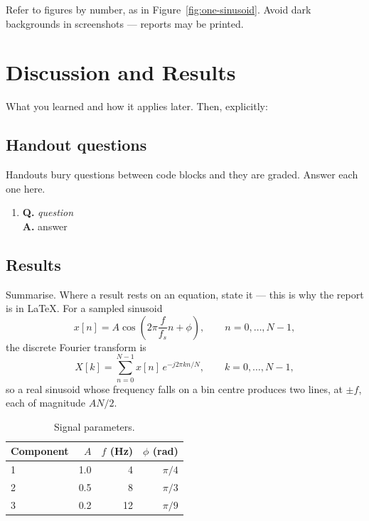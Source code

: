 \documentclass[11pt]{article}
\begin{document}
Refer to figures by number, as in Figure~\ref{fig:one-sinusoid}. Avoid dark
backgrounds in screenshots --- reports may be printed.

\section{Discussion and Results}

What you learned and how it applies later. Then, explicitly:

\subsection*{Handout questions}

Handouts bury questions between code blocks and they are graded. Answer each
one here.

\begin{enumerate}
  \item \textbf{Q.} \textit{question} \\
        \textbf{A.} answer
\end{enumerate}

\subsection*{Results}

Summarise. Where a result rests on an equation, state it --- this is why the
report is in \LaTeX{}. For a sampled sinusoid
%
\begin{equation}
  x[n] = A\cos\!\left(2\pi \frac{f}{f_s} n + \phi\right),
  \qquad n = 0,\dots,N-1,
  \label{eq:sampled-sinusoid}
\end{equation}
%
the discrete Fourier transform is
%
\begin{equation}
  X[k] = \sum_{n=0}^{N-1} x[n]\, e^{-j 2\pi k n / N},
  \qquad k = 0,\dots,N-1,
  \label{eq:dft}
\end{equation}
%
so a real sinusoid whose frequency falls on a bin centre produces two lines,
at $\pm f$, each of magnitude $AN/2$.

\begin{table}[h]
  \centering
  \caption{Signal parameters.}
  \begin{tabular}{lrrr}
    \toprule
    Component & $A$ & $f$ (Hz) & $\phi$ (rad) \\
    \midrule
    1 & 1.0 & 4  & $\pi/4$ \\
    2 & 0.5 & 8  & $\pi/3$ \\
    3 & 0.2 & 12 & $\pi/9$ \\
    \bottomrule
  \end{tabular}
\end{table}
\end{document}
